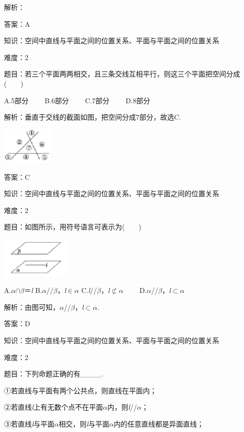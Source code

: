 \documentclass{article} %
\begin{document}
解析：

答案：A

知识：空间中直线与平面之间的位置关系、平面与平面之间的位置关系

难度：2

题目：若三个平面两两相交，且三条交线互相平行，则这三个平面把空间分成(　　)

A.5部分　　 B.6部分　　 C.7部分　　 D.8部分

解析：垂直于交线的截面如图，把空间分成7部分，故选C.

\includegraphics*[width=1.00in, height=0.71in, keepaspectratio=false]{image124}

答案：C

知识：空间中直线与平面之间的位置关系、平面与平面之间的位置关系

难度：2

题目：如图所示，用符号语言可表示为(　　)

\includegraphics*[width=1.29in, height=0.79in, keepaspectratio=false]{image125}

A.\textit{$\alpha$}$\mathrm{\cap}$\textit{$\beta$}＝\textit{l} B.\textit{$\alpha$}//\textit{$\beta$}，\textit{l}$\mathrm{\in}$\textit{$\alpha$} C.\textit{l}//\textit{$\beta$}，\textit{l}$\mathrm{\nsubset}$\textit{$\alpha$}　　 D.\textit{$\alpha$}//\textit{$\beta$}，\textit{l}$\mathrm{\subset }$\textit{$\alpha$}

解析：由图可知，\textit{$\alpha$}//\textit{$\beta$}，\textit{l}$\mathrm{\subset }$\textit{$\alpha$}.

答案：D

知识：空间中直线与平面之间的位置关系、平面与平面之间的位置关系

难度：2

题目：下列命题正确的有\_\_\_\_.

①若直线与平面有两个公共点，则直线在平面内；

②若直线\textit{l}上有无数个点不在平面\textit{$\alpha$}内，则\textit{l}//\textit{$\alpha$}；

③若直线\textit{l}与平面\textit{$\alpha$}相交，则\textit{l}与平面\textit{$\alpha$}内的任意直线都是异面直线；
\end{document}
